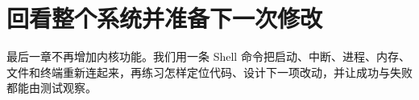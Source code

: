 \chapter{回看整个系统并准备下一次修改}

最后一章不再增加内核功能。我们用一条 Shell 命令把启动、中断、进程、内存、
文件和终端重新连起来，再练习怎样定位代码、设计下一项改动，并让成功与失败
都能由测试观察。






